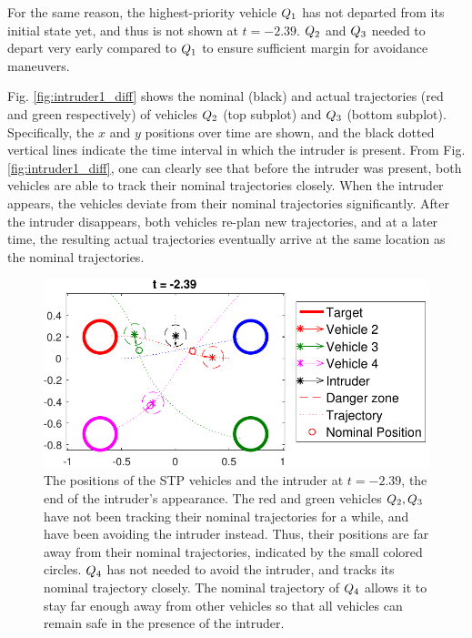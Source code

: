 For the same reason, the highest-priority vehicle $Q_1$ has not departed from its initial state yet, and thus is not shown at $t=-2.39$. $Q_2$ and $Q_3$ needed to depart very early compared to $Q_1$ to ensure sufficient margin for avoidance maneuvers.

Fig. \ref{fig:intruder1_diff} shows the nominal (black) and actual trajectories (red and green respectively) of vehicles $Q_2$ (top subplot) and $Q_3$ (bottom subplot). Specifically, the $x$ and $y$ positions over time are shown, and the black dotted vertical lines indicate the time interval in which the intruder is present. From Fig. \ref{fig:intruder1_diff}, one can clearly see that before the intruder was present, both vehicles are able to track their nominal trajectories closely. When the intruder appears, the vehicles deviate from their nominal trajectories significantly. After the intruder disappears, both vehicles re-plan new trajectories, and at a later time, the resulting actual trajectories eventually arrive at the same location as the nominal trajectories.

\begin{figure}
  \centering
  \includegraphics[width=\columnwidth]{"fig/intruder1_traj"}
  \caption{The positions of the STP vehicles and the intruder at $t=-2.39$, the end of the intruder's appearance. The red and green vehicles $Q_2, Q_3$ have not been tracking their nominal trajectories for a while, and have been avoiding the intruder instead. Thus, their positions are far away from their nominal trajectories, indicated by the small colored circles. $Q_4$ has not needed to avoid the intruder, and tracks its nominal trajectory closely. The nominal trajectory of $Q_4$ allows it to stay far enough away from other vehicles so that all vehicles can remain safe in the presence of the intruder.}
  \label{fig:intruder1_traj}
\end{figure}

